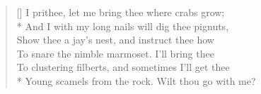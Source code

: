 \documentclass[MAIN]{subfiles}
\begin{document}
\settowidth{\versewidth}{Tell me not, sweet, I am unkind}
\begin{verse}[\versewidth]
I prithee, let me bring thee where crabs grow;\\*
And I with my long nails will dig thee pignuts,\\
Show thee a jay's nest, and instruct thee how\\
To snare the nimble marmoset. I'll bring thee\\
To clustering filberts, and sometimes I'll get thee\\*
Young scamels from the rock. Wilt thou go with me?
 \end{verse}
\end{document}
